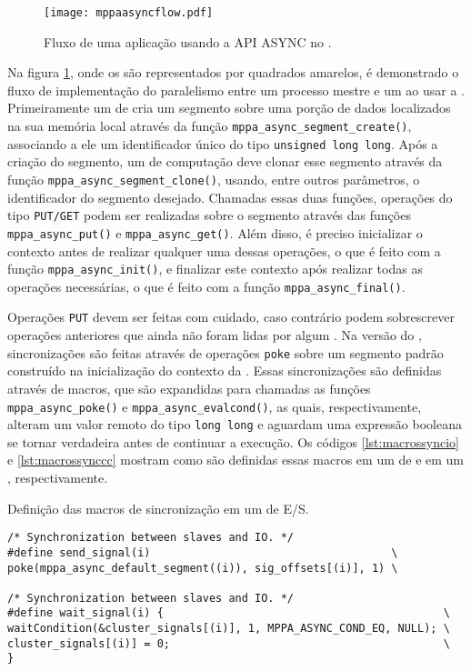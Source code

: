 \begin{figure}[tb]
  \centering
  \caption{Fluxo de uma aplicação usando a API ASYNC no \mppa.}
  \label{fig:mppaasyncflow}
  \texttt{[image: mppaasyncflow.pdf]}
\end{figure}

Na figura \ref{fig:mppaasyncflow}, onde os \clusters são representados por quadrados amarelos, é demonstrado o fluxo de implementação do paralelismo entre um processo mestre e um \CC ao usar a \ASYNC. Primeiramente um \cluster de \IO cria um segmento sobre uma porção de dados localizados na sua memória local através da função \texttt{mppa\_async\_segment\_create()}, associando a ele um identificador único do tipo \texttt{unsigned long long}. Após a criação do segmento, um \cluster de computação deve clonar esse segmento através da função \texttt{mppa\_async\_segment\_clone()}, usando, entre outros parâmetros, o identificador do segmento desejado. Chamadas essas duas funções, operações do tipo \texttt{PUT/GET} podem ser realizadas sobre o segmento através das funções \texttt{mppa\_async\_put()} e \texttt{mppa\_async\_get()}. Além disso, é preciso inicializar o contexto antes de realizar qualquer uma dessas operações, o que é feito com a função \texttt{mppa\_async\_init()}, e finalizar este contexto após realizar todas as operações necessárias, o que é feito com a função \texttt{mppa\_async\_final()}.

Operações \texttt{PUT} devem ser feitas com cuidado, caso contrário podem sobrescrever operações anteriores que ainda não foram lidas por algum \cluster. Na versão \ASYNC do \capb, sincronizações são feitas através de operações \texttt{poke} sobre um segmento padrão construído na inicialização do contexto da \API. Essas sincronizações são definidas através de macros, que são expandidas para chamadas as funções \texttt{mppa\_async\_poke()} e \texttt{mppa\_async\_evalcond()}, as quais, respectivamente, alteram um valor remoto do tipo \texttt{long long} e aguardam uma expressão booleana se tornar verdadeira antes de continuar a execução. Os códigos \ref{lst:macrossyncio} e \ref{lst:macrossynccc} mostram como são definidas essas macros em um \cluster de \IO e em um \CC, respectivamente.

\begin{listing}[tb]
\caption{Definição das macros de sincronização em um \cluster de E/S.}
\label{lst:macrossyncio}
\begin{verbatim}
/* Synchronization between slaves and IO. */
#define send_signal(i)                                     \
poke(mppa_async_default_segment((i)), sig_offsets[(i)], 1) \

/* Synchronization between slaves and IO. */
#define wait_signal(i) {                                           \
waitCondition(&cluster_signals[(i)], 1, MPPA_ASYNC_COND_EQ, NULL); \
cluster_signals[(i)] = 0;                                          \
}   
\end{verbatim}
\fonte{o autor.}
\end{listing}

